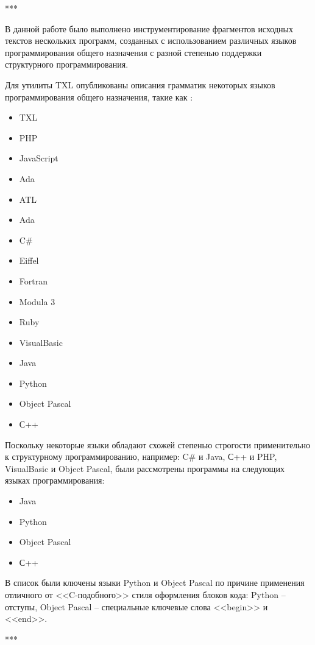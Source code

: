 ***

В данной работе было выполнено инструментирование фрагментов исходных текстов нескольких программ, созданных с использованием различных языков программирования общего назначения с разной степенью поддержки структурного программирования.

Для утилиты TXL опубликованы описания грамматик некоторых языков программирования общего назначения, такие как \cite{txl-resources}:
\begin{multicols}{2}
\begin{itemize}[noitemsep]
  \item TXL
  \item PHP
  \item JavaScript
  \item Ada
  \item ATL
  \item Ada
  \item C\#
  \item Eiffel
  \item Fortran
  \item Modula 3
  \item Ruby
  \item VisualBasic

  \item Java
  \item Python
  \item Object Pascal
  \item С++
\end{itemize}
\end{multicols}

Поскольку некоторые языки обладают схожей степенью строгости применительно к структурному программированию, например: C\# и Java, С++ и PHP, VisualBasic и Object Pascal, были рассмотрены программы на следующих языках программирования:
\begin{itemize}[noitemsep]
  \item Java
  \item Python
  \item Object Pascal
  \item С++
\end{itemize}

В список были ключены языки Python и Object Pascal по причине применения отличного от <<C-подобного>> стиля оформления блоков кода: Python -- отступы, Object Pascal -- специальные ключевые слова <<begin>> и <<end>>.

***

